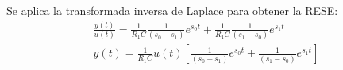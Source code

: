 Se aplica la transformada inversa de Laplace para obtener la RESE:
\begin{align*}
  \frac{y(t)}{u(t)} = \frac{1}{R_1C} \frac{1}{(s_0-s_1)}e^{s_0t} + \frac{1}{R_1C} \frac{1}{(s_1-s_0)}e^{s_1t} \\
  \tag{RESE}
  y(t) = \frac{1}{R_1C} u(t) \left[\frac{1}{(s_0-s_1)}e^{s_0t} + \frac{1}{(s_1-s_0)}e^{s_1t}\right]
\end{align*}
